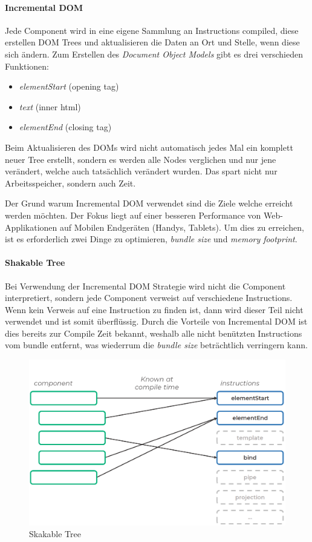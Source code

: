 \paragraph{Incremental DOM}
Jede Component wird in eine eigene Sammlung an Instructions compiled, diese erstellen DOM Trees und aktualisieren die
Daten an Ort und Stelle, wenn diese sich ändern.
Zum Erstellen des \emph{Document Object Models} gibt es drei verschieden Funktionen:

\begin{itemize}
    \item \emph{elementStart} (opening tag)
    \item \emph{text} (inner html)
    \item \emph{elementEnd} (closing tag)
\end{itemize}

Beim Aktualisieren des DOMs wird nicht automatisch jedes Mal ein komplett neuer Tree erstellt, sondern es werden alle
Nodes verglichen und nur jene verändert, welche auch tatsächlich verändert wurden.
Das spart nicht nur Arbeitsspeicher, sondern auch Zeit.

Der Grund warum Incremental DOM verwendet sind die Ziele welche erreicht werden möchten.
Der Fokus liegt auf einer besseren Performance von Web-Applikationen auf Mobilen Endgeräten (Handys, Tablets).
Um dies zu erreichen, ist es erforderlich zwei Dinge zu optimieren, \emph{bundle size} und \emph{memory footprint}.


\paragraph{Shakable Tree}
Bei Verwendung der Incremental DOM Strategie wird nicht die Component interpretiert, sondern jede Component verweist auf
verschiedene Instructions.
Wenn kein Verweis auf eine Instruction zu finden ist, dann wird dieser Teil nicht verwendet und ist somit überflüssig.
Durch die Vorteile von Incremental DOM ist dies bereits zur Compile Zeit bekannt, weshalb alle nicht benützten Instructions
vom bundle entfernt, was wiederrum die \emph{bundle size} beträchtlich verringern kann.

\begin{figure}[hbt!]
    \centering
    \includegraphics[scale=.6]{pics/shakable-tree}
    \caption{Skakable Tree}
    \label{fig:shakable-tree}
\end{figure}

